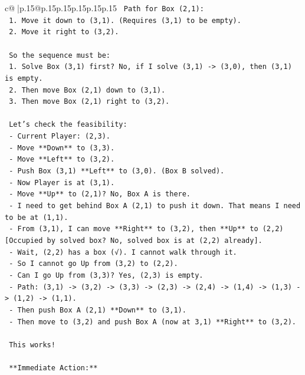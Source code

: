 \documentclass{article}
\begin{document}
{\begin{supertabular}{c@{$\;$}|p{.15\linewidth}@{}p{.15\linewidth}p{.15\linewidth}p{.15\linewidth}p{.15\linewidth}p{.15\linewidth}}
{{{\texttt{    Path for Box (2,1):} \\
\texttt{    1. Move it down to (3,1). (Requires (3,1) to be empty).} \\
\texttt{    2. Move it right to (3,2).} \\
\\ 
\texttt{    So the sequence must be:} \\
\texttt{    1. Solve Box (3,1) first? No, if I solve (3,1) {-}> (3,0), then (3,1) is empty.} \\
\texttt{    2. Then move Box (2,1) down to (3,1).} \\
\texttt{    3. Then move Box (2,1) right to (3,2).} \\
\\ 
\texttt{    Let's check the feasibility:} \\
\texttt{    {-} Current Player: (2,3).} \\
\texttt{    {-} Move **Down** to (3,3).} \\
\texttt{    {-} Move **Left** to (3,2).} \\
\texttt{    {-} Push Box (3,1) **Left** to (3,0). (Box B solved).} \\
\texttt{    {-} Now Player is at (3,1).} \\
\texttt{    {-} Move **Up** to (2,1)? No, Box A is there.} \\
\texttt{    {-} I need to get behind Box A (2,1) to push it down. That means I need to be at (1,1).} \\
\texttt{    {-} From (3,1), I can move **Right** to (3,2), then **Up** to (2,2) {[}Occupied by solved box? No, solved box is at (2,2) already{]}.} \\
\texttt{    {-} Wait, (2,2) has a box (√). I cannot walk through it.} \\
\texttt{    {-} So I cannot go Up from (3,2) to (2,2).} \\
\texttt{    {-} Can I go Up from (3,3)? Yes, (2,3) is empty.} \\
\texttt{    {-} Path: (3,1) {-}> (3,2) {-}> (3,3) {-}> (2,3) {-}> (2,4) {-}> (1,4) {-}> (1,3) {-}> (1,2) {-}> (1,1).} \\
\texttt{    {-} Then push Box A (2,1) **Down** to (3,1).} \\
\texttt{    {-} Then move to (3,2) and push Box A (now at 3,1) **Right** to (3,2).} \\
\\ 
\texttt{    This works!} \\
\\ 
\texttt{    **Immediate Action:**} \\
}}}
\end{supertabular}}
\end{document}
